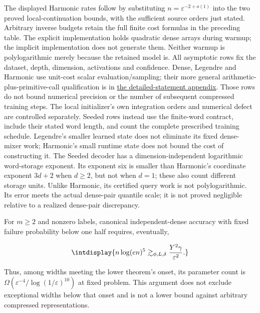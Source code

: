 The displayed Harmonic rates follow by substituting \(n=\varepsilon^{-2+o(1)}\) into the two proved local-continuation bounds, with the sufficient source orders just stated. Arbitrary inverse budgets retain the full finite cost formulas in the preceding table. The explicit implementation holds quadratic dense arrays during warmup; the implicit implementation does not generate them. Neither warmup is polylogarithmic merely because the retained model is. All asymptotic rows fix the dataset, depth, dimension, activations and confidence. Dense, Legendre and Harmonic use unit-cost scalar evaluation/sampling; their more general arithmetic-plus-primitive-call qualification is in \hyperref[int:detailed-statements]{the detailed-statement appendix}. Those rows do not bound numerical precision or the number of subsequent compressed training steps. The local initializer's own integration orders and numerical defect are controlled separately. Seeded rows instead use the finite-word contract, include their stated word length, and count the complete prescribed training schedule. Legendre's smaller learned state does not eliminate its fixed dense-mixer work; Harmonic's small runtime state does not bound the cost of constructing it. The Seeded decoder has a dimension-independent logarithmic word-storage exponent. Its exponent six is smaller than Harmonic's coordinate exponent \(3d+2\) when \(d\ge2\), but not when \(d=1\); these also count different storage units. Unlike Harmonic, its certified query work is not polylogarithmic. Its error meets the actual dense-pair quantile scale; it is not proved negligible relative to a realized dense-pair discrepancy.



For \(m\ge2\) and nonzero labels, canonical independent-dense accuracy with fixed failure probability below one half requires, eventually,


\begingroup\renewcommand{\theHequation}{intdisplay.32}
\begin{equation*}
\intdisplay{
n\log(en)^5\gtrsim_{\phi,L,\delta}\frac{Y^2\gamma}{\varepsilon^2}.
}
\end{equation*}
\endgroup


Thus, among widths meeting the lower theorem's onset, its parameter count is \(\Omega(\varepsilon^{-4}/\log(1/\varepsilon)^{10})\) at fixed problem. This argument does not exclude exceptional widths below that onset and is not a lower bound against arbitrary compressed representations.


